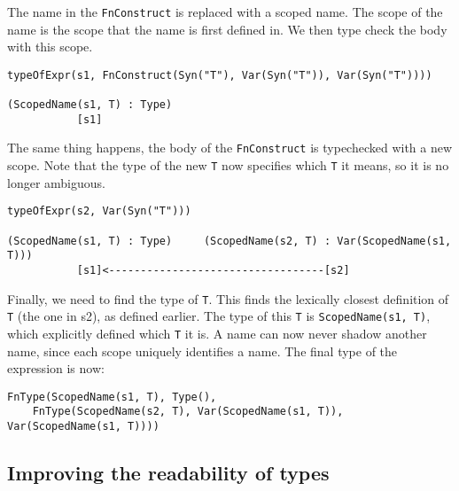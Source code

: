 \noindent
The name in the \verb|FnConstruct| is replaced with a scoped name. The scope of the name is the scope that the name is first defined in. We then type check the body with this scope. 

\begin{lstlisting}
typeOfExpr(s1, FnConstruct(Syn("T"), Var(Syn("T")), Var(Syn("T"))))
	
(ScopedName(s1, T) : Type)
	       [s1]
\end{lstlisting}

\noindent
The same thing happens, the body of the \verb|FnConstruct| is typechecked with a new scope. Note that the type of the new \verb|T| now specifies which \verb|T| it means, so it is no longer ambiguous.

\begin{lstlisting}
typeOfExpr(s2, Var(Syn("T")))
	
(ScopedName(s1, T) : Type)     (ScopedName(s2, T) : Var(ScopedName(s1, T)))
	       [s1]<----------------------------------[s2]
\end{lstlisting}

Finally, we need to find the type of \verb|T|. This finds the lexically closest definition of \verb|T| (the one in s2), as defined earlier. The type of this \verb|T| is \verb|ScopedName(s1, T)|, which explicitly defined which \verb|T| it is. A name can now never shadow another name, since each scope uniquely identifies a name. The final type of the expression is now:

\begin{lstlisting}
FnType(ScopedName(s1, T), Type(), 
	FnType(ScopedName(s2, T), Var(ScopedName(s1, T)), Var(ScopedName(s1, T))))
\end{lstlisting}

\subsection{Improving the readability of types}



